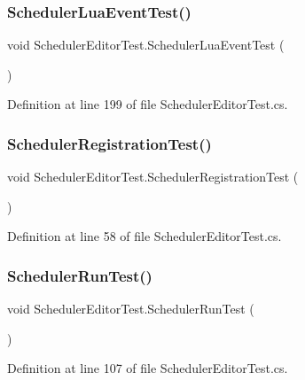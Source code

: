 \subsubsection{\texorpdfstring{Scheduler\+Lua\+Event\+Test()}{SchedulerLuaEventTest()}}
{\footnotesize\ttfamily void Scheduler\+Editor\+Test.\+Scheduler\+Lua\+Event\+Test (\begin{DoxyParamCaption}{ }\end{DoxyParamCaption})}



Definition at line 199 of file Scheduler\+Editor\+Test.\+cs.

\mbox{\label{class_scheduler_editor_test_a2162084ef8c28e356bed4374cbea50bb}} 
\subsubsection{\texorpdfstring{Scheduler\+Registration\+Test()}{SchedulerRegistrationTest()}}
{\footnotesize\ttfamily void Scheduler\+Editor\+Test.\+Scheduler\+Registration\+Test (\begin{DoxyParamCaption}{ }\end{DoxyParamCaption})}



Definition at line 58 of file Scheduler\+Editor\+Test.\+cs.

\mbox{\label{class_scheduler_editor_test_ac6c7313562c1ce4f9e6328a41dd9bbb4}} 
\subsubsection{\texorpdfstring{Scheduler\+Run\+Test()}{SchedulerRunTest()}}
{\footnotesize\ttfamily void Scheduler\+Editor\+Test.\+Scheduler\+Run\+Test (\begin{DoxyParamCaption}{ }\end{DoxyParamCaption})}



Definition at line 107 of file Scheduler\+Editor\+Test.\+cs.

